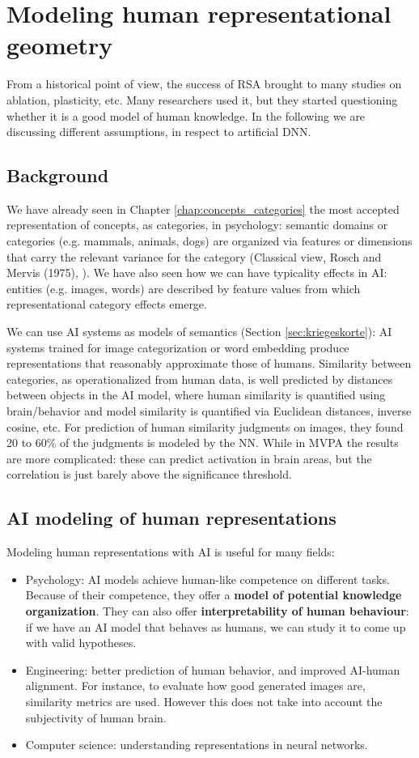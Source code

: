 \chapter{Modeling human representational geometry}
\label{chap:modeling_human}

From a historical point of view, the success of RSA brought to many studies on ablation, plasticity, etc. Many researchers used it, but they started questioning whether it is a good model of human knowledge. In the following we are discussing different assumptions, in respect to artificial DNN.

\section{Background}
We have already seen in Chapter \ref{chap:concepts_categories} the most accepted representation of concepts, as categories, in psychology: semantic domains or categories (e.g. mammals, animals, dogs) are organized via features or dimensions that carry the relevant variance for the category (Classical view, Rosch and Mervis (1975), \cite{lake-2015-deep}).
We have also seen how we can have typicality effects in AI: entities (e.g. images, words) are described by feature values from which representational category effects emerge.

We can use AI systems as models of semantics (Section \ref{sec:kriegeskorte}): AI systems trained for image categorization or word embedding produce representations that reasonably approximate those of humans. Similarity between categories, as operationalized from human data, is well predicted by distances between objects in the AI model, where human similarity is quantified using brain/behavior and model similarity is quantified via Euclidean distances, inverse cosine, etc.
For prediction of human similarity judgments on images, they found 20 to 60\% of the judgments is modeled by the NN. While in MVPA the results are more complicated: these can predict activation in brain areas, but the correlation is just barely above the significance threshold.

\section{AI modeling of human representations}
Modeling human representations with AI is useful for many fields:
\begin{itemize}
    \item Psychology: AI models achieve human-like competence on different tasks. Because of their competence, they offer a \textbf{model of potential knowledge organization}. They can also offer \textbf{interpretability of human behaviour}: if we have an AI model that behaves as humans, we can study it to come up with valid hypotheses.
    \item Engineering: better prediction of human behavior, and improved AI-human alignment. For instance, to evaluate how good generated images are, similarity metrics are used. However this does not take into account the subjectivity of human brain.
    \item Computer science: understanding representations in neural networks.
\end{itemize}

